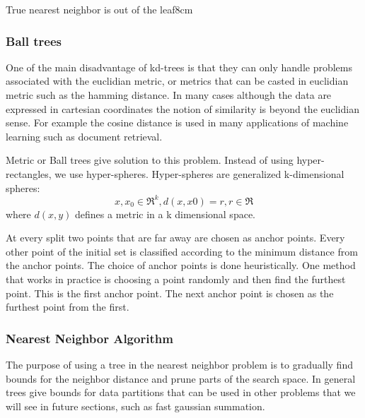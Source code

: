 \documentclass[12pt,letterpaper,doublespaced,ETD,dvips,proposal]{gtthesis}
\begin{document}
\begin{Body}



{True nearest neighbor is out of the leaf}{8cm}





\subsubsection{Ball trees}
One of the main disadvantage of kd-trees is that they can only
handle problems associated with the euclidian metric, or metrics
that can be casted in euclidian metric such as the hamming distance.
In many cases although the data are expressed in cartesian
coordinates the notion of similarity is beyond the euclidian sense.
For example the cosine distance is used in many applications of
machine learning such as document retrieval.

Metric or Ball trees give solution to this problem. Instead of using
hyper-rectangles, we use hyper-spheres. Hyper-spheres are
generalized k-dimensional spheres:
\begin{equation}
x,x_0 \in \Re^k , d(x,x0)=r, r\in \Re
\end{equation}
where $d(x, y)$ defines a metric in a k dimensional space.

At every split two points that are far away are chosen as anchor
points. Every other point of the initial set is classified according
to the minimum distance from the anchor points. The choice of anchor
points is done heuristically. One method that works in practice is
choosing a point randomly and then find the furthest point. This is
the first anchor point. The next anchor point is chosen as the
furthest point from the first.
\subsubsection{Nearest Neighbor Algorithm}
The purpose of using a tree in the nearest neighbor problem is to
gradually find bounds for the neighbor distance and prune parts of
the search space. In general trees give bounds for data partitions
that can be used in other problems that we will see in future
sections, such as fast gaussian summation.


\end{Body}
\end{document}
